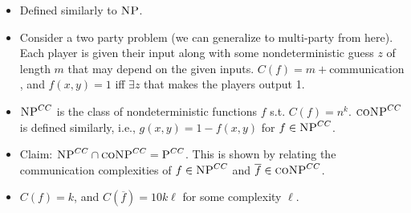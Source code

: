 \begin{itemize}
	\item Defined similarly to $\textsc{NP}$.
	\pause
	\item Consider a two party problem (we can generalize to multi-party from here).  Each player is given their input along with some nondeterministic guess $z$ of length $m$ that may depend on the given inputs.  $C(f) = m + \text{communication}$, and $f(x, y) = 1$ iff $\exists z$ that makes the players output 1.
	\pause
	\item $\textsc{NP}^{CC}$ is the class of nondeterministic functions $f$ s.t. $C(f) = n^{k}$.  $\textsc{coNP}^{CC}$ is defined similarly, i.e., $g(x, y) = 1 - f(x, y)$ for $f \in \textsc{NP}^{CC}$.
	\pause
	\item Claim: $\textsc{NP}^{CC} \cap \textsc{coNP}^{CC} = \textsc{P}^{CC}$.
	This is shown by relating the communication complexities of $f \in \textsc{NP}^{CC}$ and $\overline{f} \in \textsc{coNP}^{CC}$.
	\pause
	\item $C(f) = k$, and $C(\overline{f}) = 10k\ell$ for some complexity $\ell$.
\end{itemize}